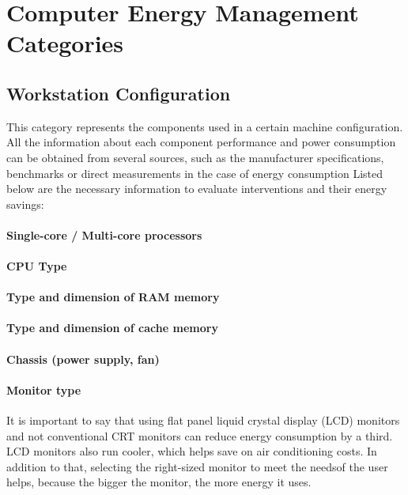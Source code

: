     \section{Computer Energy Management Categories} \label{sec2:energy_categories}
    
    \subsection{Workstation Configuration}\label{sec2:workstation_configuration}
        This category represents the components used in a certain machine configuration. All the information about each component performance and power consumption can be obtained from several sources, such as the manufacturer specifications, benchmarks or direct measurements in the case of energy consumption
        Listed below are the necessary information to evaluate interventions and their energy savings:
            \paragraph*{Single-core / Multi-core processors}%
            \paragraph*{CPU Type}%
            \paragraph*{Type and dimension of RAM memory}%
            \paragraph*{Type and dimension of cache memory}%
            \paragraph*{Chassis (power supply, fan)}%
            \paragraph*{Monitor type} It is important to say that using flat panel liquid crystal display (LCD) monitors and not conventional CRT monitors can reduce energy consumption by a third. LCD monitors also run cooler, which helps save on air conditioning costs. In addition to that, selecting the right-sized monitor to meet the needsof the user helps, because the bigger the monitor, the more energy it uses.
